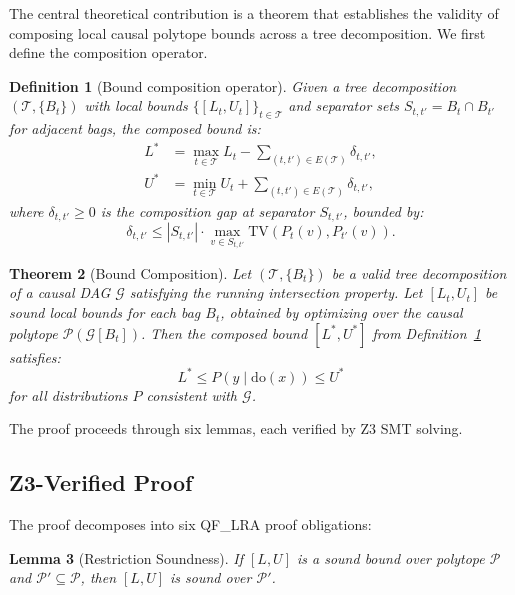 \documentclass[11pt,a4paper]{article}
\newtheorem{theorem}{Theorem}
\newtheorem{lemma}[theorem]{Lemma}
\newtheorem{definition}[theorem]{Definition}
\newcommand{\doOp}{\mathrm{do}}
\newcommand{\calG}{\mathcal{G}}
\newcommand{\calP}{\mathcal{P}}
\newcommand{\calT}{\mathcal{T}}
\newcommand{\TV}{\mathrm{TV}}
\begin{document}
The central theoretical contribution is a theorem that establishes the validity of composing local causal polytope bounds across a tree decomposition. We first define the composition operator.

\begin{definition}[Bound composition operator]
\label{def:compose}
Given a tree decomposition $(\calT, \{B_t\})$ with local bounds $\{[L_t, U_t]\}_{t \in \calT}$ and separator sets $S_{t,t'} = B_t \cap B_{t'}$ for adjacent bags, the \emph{composed bound} is:
\begin{align}
L^* &= \max_{t \in \calT} L_t - \sum_{(t,t') \in E(\calT)} \delta_{t,t'}, \label{eq:compose-lower}\\
U^* &= \min_{t \in \calT} U_t + \sum_{(t,t') \in E(\calT)} \delta_{t,t'}, \label{eq:compose-upper}
\end{align}
where $\delta_{t,t'} \geq 0$ is the \emph{composition gap} at separator $S_{t,t'}$, bounded by:
\begin{equation}
\delta_{t,t'} \leq |S_{t,t'}| \cdot \max_{v \in S_{t,t'}} \TV\!\left(P_t(v), P_{t'}(v)\right). \label{eq:gap}
\end{equation}
\end{definition}

\begin{theorem}[Bound Composition]
\label{thm:composition}
Let $(\calT, \{B_t\})$ be a valid tree decomposition of a causal DAG $\calG$ satisfying the running intersection property. Let $[L_t, U_t]$ be sound local bounds for each bag $B_t$, obtained by optimizing over the causal polytope $\calP(\calG[B_t])$. Then the composed bound $[L^*, U^*]$ from Definition~\ref{def:compose} satisfies:
\begin{equation}
L^* \leq P(y \mid \doOp(x)) \leq U^*
\end{equation}
for all distributions $P$ consistent with $\calG$.
\end{theorem}

The proof proceeds through six lemmas, each verified by Z3 SMT solving.

\subsection{Z3-Verified Proof}
\label{sec:comp-proof}

The proof decomposes into six QF\_LRA proof obligations:

\begin{lemma}[Restriction Soundness]
\label{lem:restriction}
If $[L, U]$ is a sound bound over polytope $\calP$ and $\calP' \subseteq \calP$, then $[L, U]$ is sound over $\calP'$.
\end{lemma}
\end{document}
